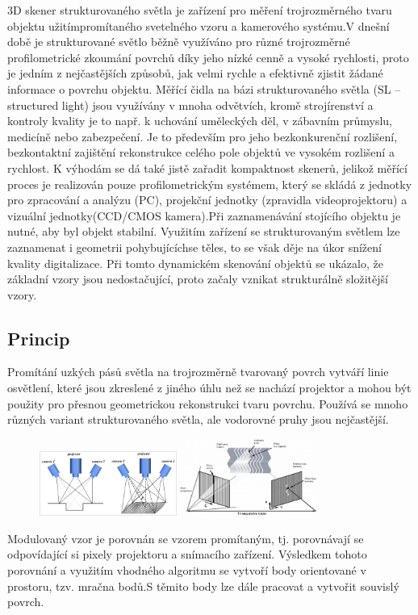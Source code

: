 3D skener strukturovaného světla je zařízení pro měření trojrozměrného tvaru objektu užitímpromítaného svetelného vzoru a kamerového systému.V dnešní době je strukturované světlo běžně využíváno pro různé trojrozměrné profilometrické zkoumání povrchů díky jeho nízké cenně a vysoké rychlosti, proto je jedním z nejčastějších způsobů, jak velmi rychle a efektivně zjistit žádané informace o povrchu objektu. Měřící čidla na bázi strukturovaného světla (SL – structured light) jsou využívány v mnoha odvětvích, kromě strojírenství a kontroly kvality je to např. k uchování uměleckých děl, v zábavním průmyslu, medicíně nebo zabezpečení. Je to především pro jeho bezkonkurenční rozlišení, bezkontaktní zajištění rekonstrukce celého pole objektů ve vysokém rozlišení a rychlost. K výhodám se dá také jistě zařadit kompaktnost skenerů, jelikož měřící proces je realizován pouze profilometrickým systémem, který se skládá z jednotky pro zpracování a analýzu (PC), projekční jednotky (zpravidla videoprojektoru) a vizuální jednotky(CCD/CMOS kamera).Při zaznamenávání stojícího objektu je nutné, aby byl objekt stabilní. Využitím zařízení se strukturovaným světlem lze zaznamenat i geometrii pohybujícíchse těles, to se však děje na úkor snížení kvality digitalizace. Při tomto dynamickém skenování objektů se ukázalo, že základní vzory jsou nedostačující, proto začaly vznikat strukturálně složitější vzory.
\subsection{Princip}
Promítání uzkých pásů světla na trojrozměrně tvarovaný povrch vytváří linie osvětlení, které jsou zkreslené z jiného úhlu než se nachází projektor a mohou být použity pro přesnou geometrickou rekonstrukci tvaru povrchu. Používá se mnoho různých variant strukturovaného světla, ale vodorovné pruhy jsou nejčastější.


\begin{figure}[H]
    \centering
    \includegraphics[width=0.4\textwidth]{assets/10_3-proj2cam.svg.png}
    \includegraphics[width=0.4\textwidth]{assets/10_triangulaceSL.png}
\end{figure}


Modulovaný vzor je porovnán se vzorem promítaným, tj. porovnávají se odpovídající si pixely projektoru a snímacího zařízení. Výsledkem tohoto porovnání a využitím vhodného algoritmu se vytvoří body orientované v prostoru, tzv. mračna bodů.S těmito body lze dále pracovat a vytvořit souvislý povrch.